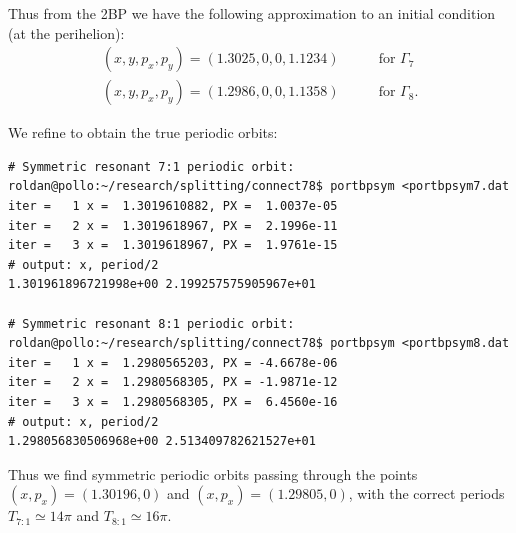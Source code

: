 \documentclass[a4paper]{amsart}
\theoremstyle{remark}
\begin{document}
Thus from the 2BP we have the following approximation to an initial
condition (at the perihelion):
\begin{align} 
(x,y,p_x,p_y)=(1.3025,0,0,1.1234) &\qquad \textrm{for }\Gamma_7 \\
(x,y,p_x,p_y)=(1.2986,0,0,1.1358) &\qquad \textrm{for }\Gamma_8. 
\end{align}



We refine to obtain the true periodic orbits:

\begin{verbatim}
# Symmetric resonant 7:1 periodic orbit:
roldan@pollo:~/research/splitting/connect78$ portbpsym <portbpsym7.dat
iter =   1 x =  1.3019610882, PX =  1.0037e-05
iter =   2 x =  1.3019618967, PX =  2.1996e-11
iter =   3 x =  1.3019618967, PX =  1.9761e-15
# output: x, period/2
1.301961896721998e+00 2.199257575905967e+01

# Symmetric resonant 8:1 periodic orbit:
roldan@pollo:~/research/splitting/connect78$ portbpsym <portbpsym8.dat
iter =   1 x =  1.2980565203, PX = -4.6678e-06
iter =   2 x =  1.2980568305, PX = -1.9871e-12
iter =   3 x =  1.2980568305, PX =  6.4560e-16
# output: x, period/2
1.298056830506968e+00 2.513409782621527e+01
\end{verbatim}
Thus we find symmetric periodic orbits passing through the points
$(x,p_x)=(1.30196,0)$ and $(x,p_x)=(1.29805,0)$, with the correct periods
$T_{7:1}\simeq14\pi$ and $T_{8:1}\simeq16\pi$.
\end{document}
